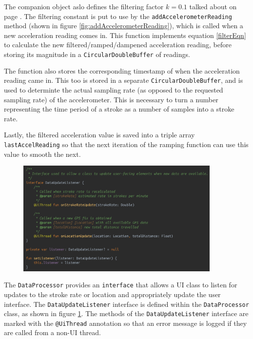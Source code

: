 \documentclass[11pt,twoside,a4paper]{report}
\begin{document}
The companion object aslo defines the filtering factor $k = 0.1$ talked about on page \pageref{filteringFactor}. The filtering constant is put to use by the \texttt{addAccelerometerReading} method (shown in figure \ref{fig:addAccelerometerReading}), which is called when a new acceleration reading comes in. This function implements equation \ref{filterEqn} to calculate the new filtered/ramped/dampened acceleration reading, before storing its magnitude in a \texttt{CircularDoubleBuffer} of readings. 

The function also stores the corresponding timestamp of when the acceleration reading came in. This too is stored in a separate \texttt{CircularDoubleBuffer}, and is used to determinte the actual sampling rate (as opposed to the requested sampling rate) of the accelerometer. This is necessary to turn a number representing the time period of a stroke as a number of samples into a stroke rate.

Lastly, the filtered acceleration value is saved into a triple array \texttt{lastAccelReading} so that the next iteration of the ramping function can use this value to smooth the next.

\begin{figure}[h!]
  \centering
  \includegraphics[width=0.9\textwidth]{code-dataProcessor-DataUpdateListener.png}
  \caption{}
  \label{fig:DataUpdateListener}
\end{figure}

The \texttt{DataProcessor} provides an \texttt{interface} that allows a UI class to listen for updates to the stroke rate or location and appropriately update the user interface. The \texttt{DataUpdateListener} interface is defined within the \texttt{DataProcessor} class, as shown in figure \ref{fig:DataUpdateListener}. The methods of the \texttt{DataUpdateListener} interface are marked with the \texttt{@UiThread} annotation so that an error message is logged if they are called from a non-UI thread.
\end{document}
